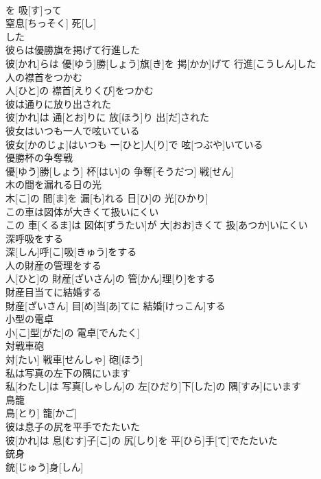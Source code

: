 \documentclass[8pt]{extreport}
\begin{document}
\begin{CJK}{UTF8}{min}
\\	を 吸[す]って 
\\	窒息[ちっそく] 死[し]
\\	した
\\	彼らは優勝旗を掲げて行進した	
\\	彼[かれ]らは 優[ゆう]勝[しょう]旗[き]を 掲[かか]げて 行進[こうしん]した
\\	人の襟首をつかむ	
\\	人[ひと]の 襟首[えりくび]をつかむ
\\	彼は通りに放り出された	
\\	彼[かれ]は 通[とお]りに 放[ほう]り 出[だ]された
\\	彼女はいつも一人で呟いている	
\\	彼女[かのじょ]はいつも 一[ひと]人[り]で 呟[つぶや]いている
\\	優勝杯の争奪戦	
\\	優[ゆう]勝[しょう] 杯[はい]の 争奪[そうだつ] 戦[せん]
\\	木の間を漏れる日の光	
\\	木[こ]の 間[ま]を 漏[も]れる 日[ひ]の 光[ひかり]
\\	この車は図体が大きくて扱いにくい	
\\	この 車[くるま]は 図体[ずうたい]が 大[おお]きくて 扱[あつか]いにくい
\\	深呼吸をする	
\\	深[しん]呼[こ]吸[きゅう]をする
\\	人の財産の管理をする	
\\	人[ひと]の 財産[ざいさん]の 管[かん]理[り]をする
\\	財産目当てに結婚する	
\\	財産[ざいさん] 目[め]当[あ]てに 結婚[けっこん]する
\\	小型の電卓	
\\	小[こ]型[がた]の 電卓[でんたく]
\\	対戦車砲	
\\	対[たい] 戦車[せんしゃ] 砲[ほう]
\\	私は写真の左下の隅にいます	
\\	私[わたし]は 写真[しゃしん]の 左[ひだり]下[した]の 隅[すみ]にいます
\\	鳥籠	
\\	鳥[とり] 籠[かご]
\\	彼は息子の尻を平手でたたいた	
\\	彼[かれ]は 息[むす]子[こ]の 尻[しり]を 平[ひら]手[て]でたたいた
\\	銃身	
\\	銃[じゅう]身[しん]

\end{CJK}
\end{document}
